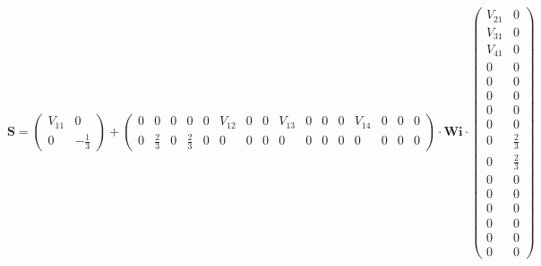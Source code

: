 \[ \mathbf{S} = \left(\begin{smallmatrix} V_{11} & 0 \\ 0 &
-\frac{1}{3} \end{smallmatrix}\right) + \left(\begin{smallmatrix} 0 &
0 & 0 & 0 & 0 & V_{12} & 0 & 0 & V_{13} & 0 & 0 & 0 & V_{14} & 0 & 0 &
0 \\ 0 & \frac{2}{3} & 0 & \frac{2}{3} & 0 & 0 & 0 & 0 & 0 & 0 & 0 & 0
& 0 & 0 & 0 & 0 \end{smallmatrix}\right) \cdot \mathbf{Wi}
\cdot\left(\begin{smallmatrix} V_{21} & 0 \\ V_{31} & 0 \\ V_{41} & 0
\\ 0 & 0 \\ 0 & 0 \\ 0 & 0 \\ 0 & 0 \\ 0 & 0 \\ 0 & \frac{2}{3} \\ 0 &
\frac{2}{3} \\ 0 & 0 \\ 0 & 0 \\ 0 & 0 \\ 0 & 0 \\ 0 & 0 \\ 0 & 0
\end{smallmatrix}\right) \]
